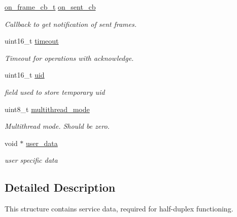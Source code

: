 \begin{DoxyCompactItemize}
\hyperlink{tiny__types_8h_ad6bf709565b8aecb9e6ecf196f219d54}{on\+\_\+frame\+\_\+cb\+\_\+t} \hyperlink{structSTinyHdData___a159a56591682bfb0ff6c5020b26590f6}{on\+\_\+sent\+\_\+cb}
\begin{DoxyCompactList}\small\item\em Callback to get notification of sent frames. \end{DoxyCompactList}\item 
\mbox{\label{structSTinyHdData___a7ca4e5b23cf480d93317245010bcbe73}} 
uint16\+\_\+t \hyperlink{structSTinyHdData___a7ca4e5b23cf480d93317245010bcbe73}{timeout}
\begin{DoxyCompactList}\small\item\em Timeout for operations with acknowledge. \end{DoxyCompactList}\item 
\mbox{\label{structSTinyHdData___a7084eac08b744ad0aa2624b854866825}} 
uint16\+\_\+t \hyperlink{structSTinyHdData___a7084eac08b744ad0aa2624b854866825}{uid}
\begin{DoxyCompactList}\small\item\em field used to store temporary uid \end{DoxyCompactList}\item 
uint8\+\_\+t \hyperlink{structSTinyHdData___a37dca10adb0dd210f02365b7fa20a598}{multithread\+\_\+mode}
\begin{DoxyCompactList}\small\item\em Multithread mode. Should be zero. \end{DoxyCompactList}\item 
\mbox{\label{structSTinyHdData___a29d80bd96abfa9640bb5c0824416f836}} 
void $\ast$ \hyperlink{structSTinyHdData___a29d80bd96abfa9640bb5c0824416f836}{user\+\_\+data}
\begin{DoxyCompactList}\small\item\em user specific data \end{DoxyCompactList}\end{DoxyCompactItemize}


\subsection{Detailed Description}
This structure contains service data, required for half-\/duplex functioning. 

